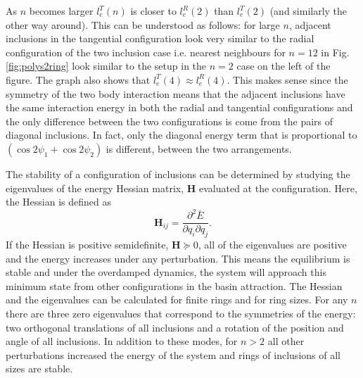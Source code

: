 As $n$ becomes larger $l_e^T(n)$ is closer to $l_e^R(2)$ than $l_e^T(2)$ (and similarly the other way around). This can be understood as follows: for large $n$, adjacent inclusions in the tangential configuration look very similar to the radial configuration of the two inclusion case i.e. nearest neighbours for $n=12$ in Fig. \ref{fig:polys2ring} look similar to the setup in the $n=2$ case on the left of the figure. The graph also shows that $l_e^T(4) \approx l_e^R(4)$. This makes sense since the symmetry of the two body interaction means that the adjacent inclusions have the same interaction energy in both the radial and tangential configurations and the only difference between the two configurations is come from the pairs of diagonal inclusions. In fact, only the diagonal energy term that is proportional to $(\cos2\psi_1+\cos2\psi_2)$ is different, between the two arrangements.

The stability of a configuration of inclusions can be determined by studying the eigenvalues of the energy Hessian matrix, $\mathbf{H}$ evaluated at the configuration. Here, the Hessian is defined as
\begin{equation}
    \mathbf{H}_{ij}=\frac{\partial^2 \bar{E}}{\partial q_i \partial q_j}.
\end{equation}
If the Hessian is positive semidefinite, $\mathbf{H} \succeq 0$, all of the eigenvalues are positive and the energy increases under any perturbation. This means the equilibrium is stable and under the overdamped dynamics, the system will approach this minimum state from other configurations in the basin attraction. The Hessian and the eigenvalues can be calculated for finite rings and for ring sizes. For any $n$ there are three zero eigenvalues that correspond to the symmetries of the energy: two orthogonal translations of all inclusions and a rotation of the position and angle of all inclusions. In addition to these modes, for $n>2$ all other perturbations increased the energy of the system and rings of inclusions of all sizes are stable.

